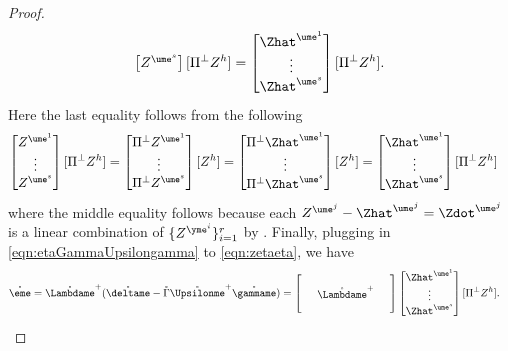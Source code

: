 \documentclass[main.tex]{subfiles}
\begin{document}
\begin{proof}
\begin{align}
\begin{bmatrix}
           Z^{\ume^s}
        \end{bmatrix}
        [\Pi^\perp  Z^{h}]
      =
        \begin{bmatrix}
          \Zhat^{\ume^1}\\
          \vdots\\
          \Zhat^{\ume^s}
        \end{bmatrix}
        [\Pi^\perp  Z^{h}]
        .
        \label{eqn:etaGammaUpsilongamma}
    \end{align}
  Here the last equality follows from the following
  \begin{align*}
    \begin{bmatrix}
       Z^{\ume^1}\\
      \vdots\\
       Z^{\ume^s}
    \end{bmatrix}
    [\Pi^\perp
     Z^{h}]
    &=
      \begin{bmatrix}
        \Pi^\perp  Z^{\ume^1}\\
        \vdots\\
        \Pi^\perp  Z^{\ume^s}
      \end{bmatrix}
       [Z^{h}]
    =
      \begin{bmatrix}
        \Pi^\perp \Zhat^{\ume^1}\\
        \vdots\\
        \Pi^\perp \Zhat^{\ume^s}
      \end{bmatrix}
       [Z^{h}]
    =
      \begin{bmatrix}
        \Zhat^{\ume^1}\\
        \vdots\\
        \Zhat^{\ume^s}
      \end{bmatrix}
      [\Pi^\perp
       Z^{h}]
  \end{align*}
  where the middle equality follows because each $ Z^{\ume^j} - \Zhat^{\ume^j} = \Zdot^{\ume^j}$ is a linear combination of $ \{Z^{\yme^i}\}_{i=1}^r$ by .
  Finally, plugging in \cref{eqn:etaGammaUpsilongamma} to \cref{eqn:zetaeta}, we have
  \begin{align*}
    \mathring{\eme}
      &=
        \mathring{\Lambdame }^+(\mathring{\deltame} - \mathring \Gamma \mathring  {\Upsilonme }^+ \mathring{\gammame})
      =
        \begin{bmatrix}
        \phz
          &\phz
            &\phz\\
        \phz
          &\mathring{\Lambdame }^+
            &\phz\\
        \phz
          &\phz
            &\phz
        \end{bmatrix}
        \begin{bmatrix}
          \Zhat^{\ume^1}\\
          \vdots\\
          \Zhat^{\ume^s}
        \end{bmatrix}
        [\Pi^\perp  Z^{h}]
        .
  \end{align*}
  \end{proof}
  
\end{document}
